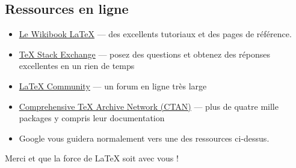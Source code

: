 \documentclass{beamer}
\begin{document}
\subsection{Ressources en ligne}
\begin{frame}{\insertsubsection}
\begin{itemize}
\item \href{http://en.wikibooks.org/wiki/LaTeX}{Le Wikibook \LaTeX{}} ---
des excellents tutoriaux et des pages de référence.
\item \href{http://tex.stackexchange.com/}{\TeX{} Stack Exchange} --- posez des questions et obtenez des réponses excellentes en un rien de temps
\item \href{http://www.latex-community.org/}{\LaTeX{} Community} --- un forum en ligne très large
\item \href{http://ctan.org/}{Comprehensive \TeX{} Archive Network (CTAN)} ---
plus de quatre mille packages y compris leur documentation
\item Google vous guidera normalement vers une des ressources ci-dessus.
\end{itemize}
\end{frame}

\begin{frame}
\begin{center}
Merci et que la force de \LaTeX{} soit avec vous !
\end{center}
\end{frame}
\end{document}
